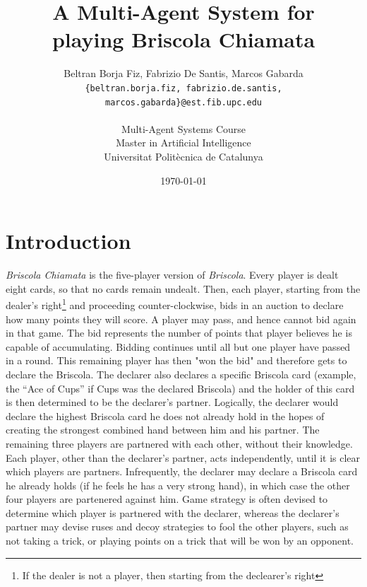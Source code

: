 \documentclass[a4paper]{article}
\begin{document}
\title{A Multi-Agent System for\\ playing Briscola Chiamata}
 
\author{Beltran Borja Fiz, Fabrizio De Santis, Marcos Gabarda\\
\small \texttt{\{beltran.borja.fiz, fabrizio.de.santis, marcos.gabarda\}@est.fib.upc.edu}\\
\\
Multi-Agent Systems Course\\
Master in Artificial Intelligence\\
Universitat Polit\`ecnica de Catalunya}
\date{\today}

\newenvironment{fminipage}%
  {\begin{Sbox}\begin{minipage}}%
  {\end{minipage}\end{Sbox}\fbox{\TheSbox}}


\maketitle

\tableofcontents

\newpage

\section{Introduction}\label{sec:intro}

\emph{Briscola Chiamata} is the five-player version of \emph{Briscola}. Every player is dealt eight cards, so that no cards remain undealt. Then, each player, starting from the dealer's right\footnote{If the dealer is not a player, then starting from the declearer's right} and proceeding counter-clockwise, bids in an auction to declare how many points they will score. A player may pass, and hence cannot bid again in that game. The bid represents the number of points that player believes he is capable of accumulating. Bidding continues until all but one player have passed in a round. This remaining player has then "won the bid" and therefore gets to declare the Briscola. The declarer also declares a specific Briscola card (example, the ``Ace of Cups'' if Cups was the declared Briscola) and the holder of this card is then determined to be the declarer's partner. Logically, the declarer would declare the highest Briscola card he does not already hold in the hopes of creating the strongest combined hand between him and his partner.
The remaining three players are partnered with each other, without their knowledge. Each player, other than the declarer's partner, acts independently, until it is clear which players are partners. Infrequently, the declarer may declare a Briscola card he already holds (if he feels he has a very strong hand), in which case the other four players are partenered against him.
Game strategy is often devised to determine which player is partnered with the declarer, whereas the declarer's partner may devise ruses and decoy strategies to fool the other players, such as not taking a trick, or playing points on a trick that will be won by an opponent.
\end{document}
